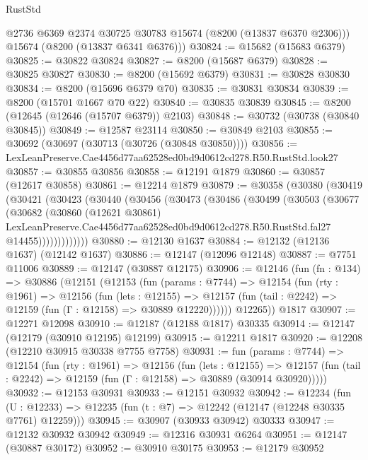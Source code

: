 \begin{lexlean}{RustStd}
\begin{coremodule}
        @2736
        @6369
        @2374
        @30725
        @30783
        @15674
        (@8200 (@13837 @6370 @2306)))
      @15674
      (@8200 (@13837 @6341 @6376)))
@30824 := @15682 (@15683 @6379)
@30825 := @30822 @30824
@30827 := @8200 (@15687 @6379)
@30828 := @30825 @30827
@30830 := @8200 (@15692 @6379)
@30831 := @30828 @30830
@30834 := @8200 (@15696 @6379 @70)
@30835 := @30831 @30834
@30839 := @8200 (@15701 @1667 @70 @22)
@30840 := @30835 @30839
@30845 := @8200 (@12645 (@12646 (@15707 @6379)) @2103)
@30848 := @30732 (@30738 (@30840 @30845))
@30849 := @12587 @23114
@30850 := @30849 @2103
@30855 := @30692 (@30697 (@30713 (@30726 (@30848 @30850))))
@30856 := LexLeanPreserve.Cae4456d77aa62528ed0bd9d0612cd278.R50.RustStd.look27
@30857 := @30855 @30856
@30858 := @12191 @1879
@30860 := @30857 (@12617 @30858)
@30861 := @12214 @1879
@30879 := @30358
    (@30380
      (@30419
        (@30421
          (@30423
            (@30440
              (@30456
                (@30473
                  (@30486
                    (@30499
                      (@30503
                        (@30677
                          (@30682
                            (@30860
                              (@12621 @30861)
                              LexLeanPreserve.Cae4456d77aa62528ed0bd9d0612cd278.R50.RustStd.fal27
                              @14455)))))))))))))
@30880 := @12130 @1637
@30884 := @12132 (@12136 @1637) (@12142 @1637)
@30886 := @12147 (@12096 @12148)
@30887 := @7751 @11006
@30889 := @12147 (@30887 @12175)
@30906 := @12146
    (fun (fn : @134) =>
    @30886
      (@12151
        (@12153
          (fun (params : @7744) =>
          @12154
            (fun (rty : @1961) =>
            @12156
              (fun (lets : @12155) =>
              @12157 (fun (tail : @2242) => @12159 (fun (Γ : @12158) => @30889 @12220))))))
        @12265))
    @1817
@30907 := @12271 @12098
@30910 := @12187 (@12188 @1817) @30335
@30914 := @12147 (@12179 (@30910 @12195) @12199)
@30915 := @12211 @1817
@30920 := @12208 (@12210 @30915 @30338 @7755 @7758)
@30931 := fun (params : @7744) =>
  @12154
    (fun (rty : @1961) =>
    @12156
      (fun (lets : @12155) =>
      @12157 (fun (tail : @2242) => @12159 (fun (Γ : @12158) => @30889 (@30914 @30920)))))
@30932 := @12153 @30931
@30933 := @12151 @30932
@30942 := @12234
    (fun (U : @12233) => @12235 (fun (t : @7) => @12242 (@12147 (@12248 @30335 @7761) @12259)))
@30945 := @30907 (@30933 @30942) @30333
@30947 := @12132 @30932 @30942
@30949 := @12316 @30931 @6264
@30951 := @12147 (@30887 @30172)
@30952 := @30910 @30175
@30953 := @12179 @30952

\end{coremodule}
\end{lexlean}
